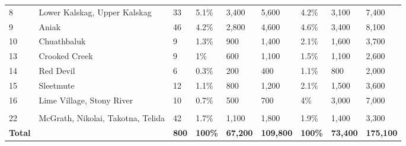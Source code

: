 \documentclass[12pt,]{book}
\theoremstyle{definition}
\theoremstyle{definition}
\theoremstyle{definition}
\theoremstyle{remark}
\begin{document}
\begin{landscape}
\begin{table}
\begin{tabular}[t]{lllllllll}
\addlinespace[0.3em]
\hline
\multicolumn{9}{l}{\textbf{Middle River}}\\
\hline
\hspace{1em}8 & Lower Kalskag, Upper Kalskag & 33 & 5.1\% & 3,400 & 5,600 & 4.2\% & 3,100 & 7,400\\
\hspace{1em}9 & Aniak & 46 & 4.2\% & 2,800 & 4,600 & 4.6\% & 3,400 & 8,100\\
\hspace{1em}10 & Chuathbaluk & 9 & 1.3\% & 900 & 1,400 & 2.1\% & 1,600 & 3,700\\
\hspace{1em}13 & Crooked Creek & 9 & 1\% & 600 & 1,100 & 1.5\% & 1,100 & 2,600\\
\hspace{1em}14 & Red Devil & 6 & 0.3\% & 200 & 400 & 1.1\% & 800 & 2,000\\
\hspace{1em}15 & Sleetmute & 12 & 1.1\% & 800 & 1,200 & 2.1\% & 1,500 & 3,600\\
\hspace{1em}16 & Lime Village, Stony River & 10 & 0.7\% & 500 & 700 & 4\% & 3,000 & 7,000\\
\addlinespace[0.3em]
\hline
\multicolumn{9}{l}{\textbf{Upper River}}\\
\hline
\hspace{1em}22 & McGrath, Nikolai, Takotna, Telida & 42 & 1.7\% & 1,100 & 1,800 & 1.9\% & 1,400 & 3,300\\
\textbf{Total} & \textbf{} & \textbf{800} & \textbf{100\%} & \textbf{67,200} & \textbf{109,800} & \textbf{100\%} & \textbf{73,400} & \textbf{175,100}\\
\bottomrule
\end{tabular}
\end{table}
\end{landscape}

\clearpage
\end{document}
